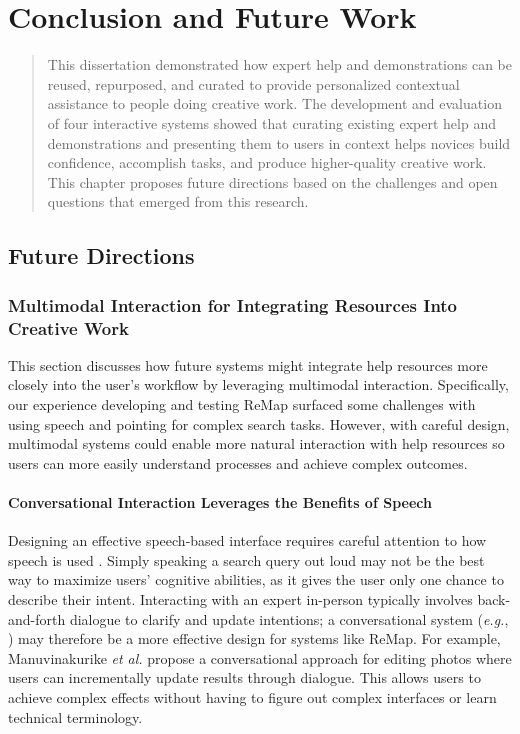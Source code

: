 \chapter{Conclusion and Future Work}
\label{chapter:discussion}
\begin{quote}
This dissertation demonstrated how expert help and demonstrations can be reused, repurposed, and curated to provide personalized contextual assistance to people doing creative work. The development and evaluation of four interactive systems showed that curating existing expert help and demonstrations and presenting them to users in context helps novices build confidence, accomplish tasks, and produce higher-quality creative work. This chapter proposes future directions based on the challenges and open questions that emerged from this research.
\end{quote}

\section{Future Directions}
\subsection{Multimodal Interaction for Integrating Resources Into Creative Work}
This section discusses how future systems might integrate help resources more closely into the user's workflow by leveraging multimodal interaction. Specifically, our experience developing and testing ReMap surfaced some challenges with using speech and pointing for complex search tasks. However, with careful design, multimodal systems could enable more natural interaction with help resources so users can more easily understand processes and achieve complex outcomes.

\subsubsection{Conversational Interaction Leverages the Benefits of Speech}
Designing an effective speech-based interface requires careful attention to how speech is used \cite{Hugunin1997}. Simply speaking a search query out loud may not be the best way to maximize users' cognitive abilities, as it gives the user only one chance to describe their intent. Interacting with an expert in-person typically involves back-and-forth dialogue to clarify and update intentions; a conversational system (\textit{e.g.}, \cite{Hugunin1997, Manuvinakurike2018}) may therefore be a more effective design for systems like ReMap. For example, Manuvinakurike \textit{et al.} \cite{Manuvinakurike2018} propose a conversational approach for editing photos where users can incrementally update results through dialogue. This allows users to achieve complex effects without having to figure out complex interfaces or learn technical terminology.

